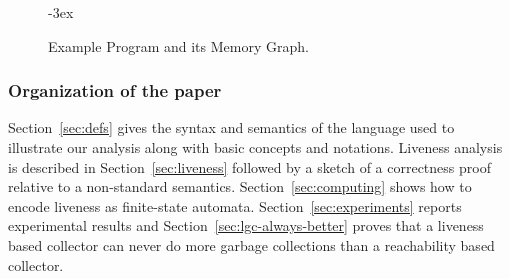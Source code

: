 \begin{figure}[t!]
\kern -3ex

\caption{Example Program and its Memory Graph.}\label{fig:mot-example}    
\end{figure}


\subsubsection{Organization of the paper}
Section~\ref{sec:defs} gives
the syntax and semantics of
the language used to illustrate our analysis along with basic concepts
and    notations.
Liveness analysis is described in
Section~\ref{sec:liveness} followed by a sketch of a correctness
proof relative to a non-standard semantics.
Section~\ref{sec:computing} shows how to encode liveness as
finite-state automata.
Section~\ref{sec:experiments}   reports   experimental   results and
Section~\ref{sec:lgc-always-better} proves that a liveness based
collector can never do more garbage collections than a reachability
based collector. 

